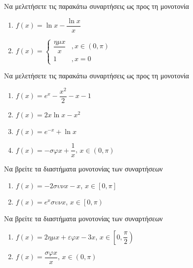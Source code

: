 \documentclass{presentation}
\begin{document}
\begin{askisi}
    Να μελετήσετε τις παρακάτω συναρτήσεις ως προς τη μονοτονία
    \begin{enumerate}
        \item<1-> $f(x)=\ln x-\dfrac{\ln x}{x}$
        \item<2-> $f(x)=\begin{cases}
                    \dfrac{ημx}{x} & ,x\in (0,\pi) \\
                    1              & ,x=0
                \end{cases}$
    \end{enumerate}

\end{askisi}

\begin{askisi}
    Να μελετήσετε τις παρακάτω συναρτήσεις ως προς τη μονοτονία
    \begin{enumerate}
        \item<1-> $f(x)=e^x-\dfrac{x^2}{2}-x-1$
        \item<2-> $f(x)=2x\ln x-x^2$
        \item<3-> $f(x)=e^{-x}+\ln x$
        \item<4-> $f(x)=-σφx+\dfrac{1}{x}$, $x\in (0,\pi)$
    \end{enumerate}

\end{askisi}

\begin{askisi}
    Να βρείτε τα διαστήματα μονοτονίας των συναρτήσεων
    \begin{enumerate}
        \item<1-> $f(x)=-2συνx-x$, $x\in [0,\pi]$
        \item<2-> $f(x)=e^xσυνx$, $x\in \left[ 0,\pi \right) $
    \end{enumerate}

\end{askisi}

\begin{askisi}
    Να βρείτε τα διαστήματα μονοτονίας των συναρτήσεων
    \begin{enumerate}
        \item<1-> $f(x)=2ημx+εφx-3x$, $x\in \left[ 0,\dfrac{\pi}{2} \right) $
        \item<2-> $f(x)=\dfrac{σφx}{x}$, $x\in (0,\pi) $
    \end{enumerate}

\end{askisi}
\end{document}
